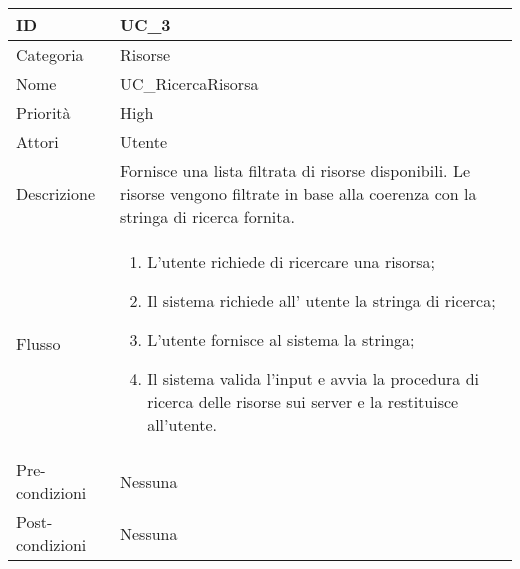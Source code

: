 \begin{center}
\begin{tabular}{ |p{2cm}|p{13cm}|  }
\hline
ID & UC\_3 \\\hline
Categoria & Risorse \\\hline
Nome & UC\_RicercaRisorsa\\\hline
Priorità & High \\\hline
Attori &  Utente \\\hline
Descrizione & Fornisce una lista filtrata di risorse disponibili. Le risorse vengono filtrate in base alla coerenza con la stringa di ricerca fornita.\\\hline
Flusso &  	\begin{enumerate}
			\item L'utente richiede di ricercare una risorsa;
			\item Il sistema richiede all' utente la stringa di ricerca;
			\item L'utente fornisce al sistema la stringa;
			\item Il sistema valida l'input e avvia la procedura di ricerca delle risorse sui server e la restituisce all'utente. %
			
		\end{enumerate}\\\hline
Pre-condizioni &  Nessuna\\\hline
Post-condizioni &  Nessuna\\\hline
\end{tabular}
\label{table_use_case:3}\newline



\end{center}
